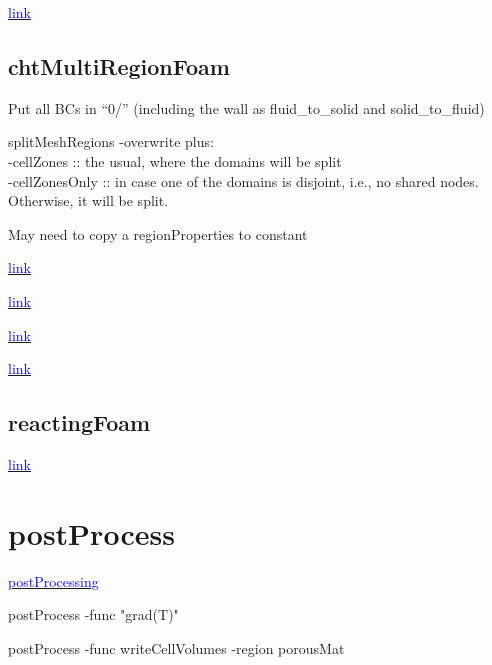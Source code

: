 \documentclass[a4paper, 12pt]{article}
\numberwithin{equation}{section}
\newcommand{\code}{\fontfamily{pcr}\selectfont}
\newcommand{\blue}[1]{\textcolor{blue}{#1}}
\begin{document}
        \href{https://www.openfoam.com/documentation/guides/latest/doc/guide-applications-solvers-compressible-rhoPimpleFoam.html}{\blue{link}}

    \subsection{chtMultiRegionFoam}

        Put all BCs in ``0/'' (including the wall as fluid\_to\_solid and solid\_to\_fluid)

        {\code splitMeshRegions -overwrite} plus: \\
          {\code -cellZones} :: the usual, where the domains will be split \\
          {\code -cellZonesOnly} :: in case one of the domains is disjoint, i.e., no shared nodes. Otherwise, it will be split.

        May need to copy a {\code regionProperties} to {\code constant}

        \href{https://www.cfd-online.com/Forums/openfoam/233208-conjugate-heat-transfer-contact-thermal-resistance-both-patches.html}{\blue{link}}

        \href{https://www.sciencedirect.com/science/article/pii/S1290072920312606?fr=RR-2&ref=pdf_download&rr=8b9465ed4a1ce157}{\blue{link}}

        \href{https://doc.openfoam.com/2306/tools/processing/solvers/rtm/heat-transfer/chtMultiRegionFoam/}{\blue{link}}

        \href{https://help.sim-flow.com/solvers/cht-multi-region-foam}{\blue{link}}

    \subsection{reactingFoam}

        \href{https://help.sim-flow.com/solvers/reacting-foam}{\blue{link}}

\clearpage
\section{postProcess}

    \href{https://doc.openfoam.com/2306/tools/post-processing/function-objects/#}{\blue{postProcessing}}

    {\code postProcess -func "grad(T)"}

    {\code postProcess -func writeCellVolumes -region porousMat}
\end{document}
